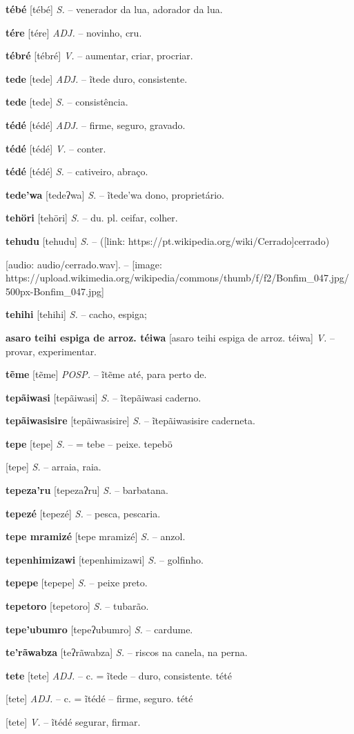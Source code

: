 {{{{\textbf{tébé} [tébé] \textit{S.} -- venerador da lua, adorador da lua.

\textbf{tére} [tére] \textit{ADJ.} -- novinho, cru.

\textbf{tébré} [tébré] \textit{V.} -- aumentar, criar, procriar.

\textbf{tede} [tede] \textit{ADJ.} -- ĩtede duro, consistente.

\textbf{tede} [tede] \textit{S.} -- consistência.

\textbf{tédé} [tédé] \textit{ADJ.} -- firme, seguro, gravado.

\textbf{tédé} [tédé] \textit{V.} -- conter.

\textbf{tédé} [tédé] \textit{S.} -- cativeiro, abraço.

\textbf{tede'wa} [tedeʔwa] \textit{S.} -- ĩtede'wa dono, proprietário.

\textbf{tehöri} [tehöri] \textit{S.} -- du. pl. ceifar, colher.

\textbf{tehudu} [tehudu] \textit{S.} -- ([link: https://pt.wikipedia.org/wiki/Cerrado]cerrado)} [audio: audio/cerrado.wav]{\faHeadphones}. -- [image: https://upload.wikimedia.org/wikipedia/commons/thumb/f/f2/Bonfim_047.jpg/500px-Bonfim_047.jpg]

\textbf{tehihi} [tehihi] \textit{S.} -- cacho, espiga;

\textbf{asaro teihi espiga de arroz. téiwa} [asaro teihi espiga de arroz. téiwa] \textit{V.} -- provar, experimentar.

\textbf{tẽme} [tẽme] \textit{POSP.} -- ĩtẽme até, para perto de.

\textbf{tepãiwasi} [tepãiwasi] \textit{S.} -- ĩtepãiwasi caderno.

\textbf{tepãiwasisire} [tepãiwasisire] \textit{S.} -- ĩtepãiwasisire caderneta.

\textbf{tepe} [tepe] \textit{S.} -- = tebe -- peixe. tepebö} [tepe] \textit{S.} -- arraia, raia.

\textbf{tepeza'ru} [tepezaʔru] \textit{S.} -- barbatana.

\textbf{tepezé} [tepezé] \textit{S.} -- pesca, pescaria.

\textbf{tepe mramizé} [tepe mramizé] \textit{S.} -- anzol.

\textbf{tepenhimizawi} [tepenhimizawi] \textit{S.} -- golfinho.

\textbf{tepepe} [tepepe] \textit{S.} -- peixe preto.

\textbf{tepetoro} [tepetoro] \textit{S.} -- tubarão.

\textbf{tepe'ubumro} [tepeʔubumro] \textit{S.} -- cardume.

\textbf{te'rãwabza} [teʔrãwabza] \textit{S.} -- riscos na canela, na perna.

\textbf{tete} [tete] \textit{ADJ.} -- c. = ĩtede -- duro, consistente. tété} [tete] \textit{ADJ.} -- c. = ĩtédé -- firme, seguro. tété} [tete] \textit{V.} -- ĩtédé segurar, firmar.


